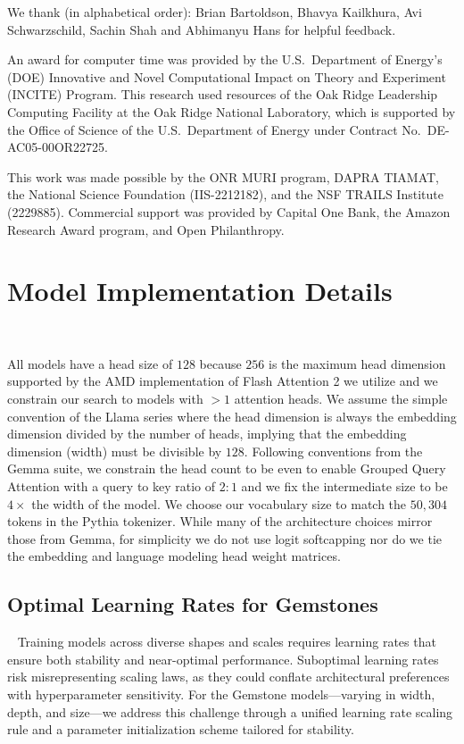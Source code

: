 \documentclass{article}
\begin{document}
\clearpage

\begin{ack}
We thank (in alphabetical order): Brian Bartoldson, Bhavya Kailkhura, Avi Schwarzschild, Sachin Shah and Abhimanyu Hans for helpful feedback.

An award for computer time was provided by the U.S.~Department of Energy’s (DOE) Innovative and Novel Computational Impact on Theory and Experiment (INCITE) Program. This research used resources of the Oak Ridge Leadership Computing Facility at the Oak Ridge National Laboratory, which is supported by the Office of Science of the U.S.~Department of Energy under Contract No.~DE-AC05-00OR22725.

This work was made possible by the ONR MURI program, DAPRA TIAMAT, the National Science Foundation (IIS-2212182), and the NSF TRAILS Institute (2229885). Commercial support was provided by Capital One Bank, the Amazon Research Award program, and Open Philanthropy. 
\end{ack}




\newpage
\appendix
\onecolumn
\section{Model Implementation Details}~\label{app-sec:implementation}

All models have a head size of \(128\) because \(256\) is the maximum head dimension supported by the AMD implementation of Flash Attention 2 we utilize and we constrain our search to models with $>1$ attention heads.
We assume the simple convention of the Llama series where the head dimension is always the embedding dimension divided by the number of heads, implying that the embedding dimension (width) must be divisible by $128$. Following conventions from the Gemma suite, we constrain the head count to be even to enable Grouped Query Attention \citep{ainslie2023gqa} with a query to key ratio of $2:1$ and we fix the intermediate size to be \(4\times \) the width of the model. We choose our vocabulary size to match the $50,304$ tokens in the Pythia tokenizer. While many of the architecture choices mirror those from Gemma, for simplicity we do not use logit softcapping nor do we tie the embedding and language modeling head weight matrices.

\subsection{Optimal Learning Rates for Gemstones}~\label{sec:learning-rates}
Training models across diverse shapes and scales requires learning rates that ensure both stability and near-optimal performance. Suboptimal learning rates risk misrepresenting scaling laws, as they could conflate architectural preferences with hyperparameter sensitivity. For the Gemstone models---varying in width, depth, and size---we address this challenge through a unified learning rate scaling rule and a parameter initialization scheme tailored for stability.
\end{document}
